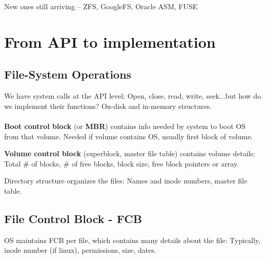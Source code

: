 New ones still arriving – ZFS, GoogleFS, Oracle ASM, FUSE

\newpage

\section{From API to implementation}

\subsection{File-System Operations}

We have system calls at the API level:  Open, close, read, write, seek...but how do we implement their functions? On-disk and in-memory structures.

\paragraph{}
\textbf{Boot control block} (or \textbf{MBR}) contains info needed by system to boot OS from
that volume. Needed if volume contains OS, usually first block of volume.

\textbf{Volume control block} (superblock, master file table) contains volume details: Total \# of blocks, \# of free blocks, block size, free block pointers or array.

Directory structure organizes the files: Names and inode numbers, master file table.

\subsection{File Control Block - FCB}

OS maintains FCB per file, which contains many details about the file: Typically, inode number (if linux), permissions, size, dates.


